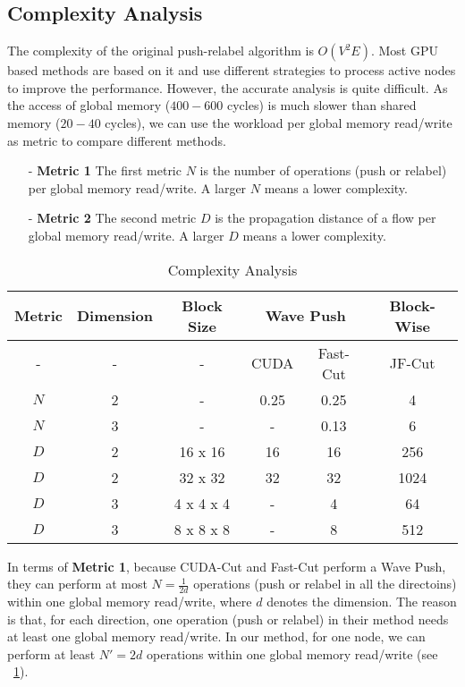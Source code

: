 \subsection{\textbf{Complexity Analysis}}

The complexity of the original push-relabel algorithm is $O(V^2 E)$.
Most GPU based methods are based on it and use different strategies to process active nodes to improve the performance.
However, the accurate analysis is quite difficult.
As the access of global memory ($400-600$ cycles) is much slower than shared memory ($20-40$ cycles), we can use the workload per global memory read/write as metric to compare different methods.

\begin{itemize}
\item[-] \textbf{Metric 1} The first metric $N$ is the number of operations (push or relabel) per global memory read/write. A larger $N$ means a lower complexity.
\item[-] \textbf{Metric 2} The second metric $D$ is the propagation distance of a flow per global memory read/write. A larger $D$ means a lower complexity.
\end{itemize}

\begin{table}
\center
\caption{Complexity Analysis}
\label{table complexity analysis}
{
    \fontsize{6.5pt}{7.5pt}\selectfont
    \begin{tabular}{@{ }c|c|c|c|c|c@{ }}
    \hline
    Metric   & Dimension & Block Size & \multicolumn{2}{c}{Wave Push} & \multicolumn{1}{c}{Block-Wise}\\
    \hline
    -   & - & -         & CUDA & Fast-Cut & JF-Cut\\
    \hline
    $N$ & 2 & -         & 0.25 & 0.25 & 4    \\
    $N$ & 3 & -         & -    & 0.13 & 6    \\
    \hline
    $D$ & 2 & 16 x 16   & 16   & 16   & 256  \\
    $D$ & 2 & 32 x 32   & 32   & 32   & 1024 \\
    $D$ & 3 & 4 x 4 x 4 & -    & 4    & 64   \\
    $D$ & 3 & 8 x 8 x 8 & -    & 8    & 512  \\
    \hline
    \end{tabular}
}
\end{table}

In terms of \textbf{Metric 1}, because CUDA-Cut and Fast-Cut perform a Wave Push, they can perform at most $N=\frac{1}{2d}$ operations (push or relabel in all the directoins) within one global memory read/write, where $d$ denotes the dimension.
The reason is that, for each direction, one operation (push or relabel) in their method needs at least one global memory read/write.
In our method, for one node, we can perform at least $N'=2d$ operations within one global memory read/write (see \tablename \ \ref{table complexity analysis}).

